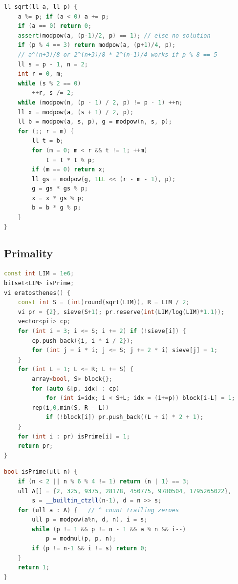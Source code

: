 \begin{multicols}{\Columns}
\begin{lstlisting}[language=C++]
ll sqrt(ll a, ll p) {
	a %= p; if (a < 0) a += p;
	if (a == 0) return 0;
	assert(modpow(a, (p-1)/2, p) == 1); // else no solution
	if (p % 4 == 3) return modpow(a, (p+1)/4, p);
	// a^(n+3)/8 or 2^(n+3)/8 * 2^(n-1)/4 works if p % 8 == 5
	ll s = p - 1, n = 2;
	int r = 0, m;
	while (s % 2 == 0)
		++r, s /= 2;
	while (modpow(n, (p - 1) / 2, p) != p - 1) ++n;
	ll x = modpow(a, (s + 1) / 2, p);
	ll b = modpow(a, s, p), g = modpow(n, s, p);
	for (;; r = m) {
		ll t = b;
		for (m = 0; m < r && t != 1; ++m)
			t = t * t % p;
		if (m == 0) return x;
		ll gs = modpow(g, 1LL << (r - m - 1), p);
		g = gs * gs % p;
		x = x * gs % p;
		b = b * g % p;
	}
}
\end{lstlisting}


\subsection{Primality}
\begin{lstlisting}[language=C++]
const int LIM = 1e6;
bitset<LIM> isPrime;
vi eratosthenes() {
	const int S = (int)round(sqrt(LIM)), R = LIM / 2;
	vi pr = {2}, sieve(S+1); pr.reserve(int(LIM/log(LIM)*1.1));
	vector<pii> cp;
	for (int i = 3; i <= S; i += 2) if (!sieve[i]) {
		cp.push_back({i, i * i / 2});
		for (int j = i * i; j <= S; j += 2 * i) sieve[j] = 1;
	}
	for (int L = 1; L <= R; L += S) {
		array<bool, S> block{};
		for (auto &[p, idx] : cp)
			for (int i=idx; i < S+L; idx = (i+=p)) block[i-L] = 1;
		rep(i,0,min(S, R - L))
			if (!block[i]) pr.push_back((L + i) * 2 + 1);
	}
	for (int i : pr) isPrime[i] = 1;
	return pr;
}
\end{lstlisting}

\begin{lstlisting}[language=C++]
bool isPrime(ull n) {
	if (n < 2 || n % 6 % 4 != 1) return (n | 1) == 3;
	ull A[] = {2, 325, 9375, 28178, 450775, 9780504, 1795265022},
	    s = __builtin_ctzll(n-1), d = n >> s;
	for (ull a : A) {   // ^ count trailing zeroes
		ull p = modpow(a%n, d, n), i = s;
		while (p != 1 && p != n - 1 && a % n && i--)
			p = modmul(p, p, n);
		if (p != n-1 && i != s) return 0;
	}
	return 1;
}
\end{lstlisting}


\end{multicols}
